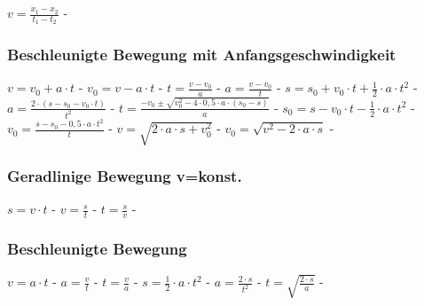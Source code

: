 $ v = \frac{x_{1}  - x_{2} }{t_{1}  - t_{2} } $ - \\ 
 
\subsubsection{Beschleunigte Bewegung mit Anfangsgeschwindigkeit} 
\begin{minipage}{0.45\textwidth} 
\end{minipage} 
\begin{minipage}{0.45\textwidth} 
 
\legende{}\end{minipage} 
 
$ v = v_{0}  + a\cdot t $ - $ v_{0}  = v - a\cdot t $ - $ t = \frac{v - v_{0} }{a} $ - $ a = \frac{v - v_{0} }{  t} $ - $ s = s_{0}  + v_{0} \cdot t + \frac{1}{2}\cdot a\cdot t^{2} $ - $ a = \frac{2\cdot (s - s_{0}  - v_{0} \cdot t)}{     t^{2} } $ - $ t = \frac{-v_{0}  \pm \sqrt{v_{0} ^{2} -4\cdot 0,5\cdot a\cdot (s_{0}  -s)}}{       a} $ - $ s_{0}  = s - v_{0} \cdot t - \frac{1}{2}\cdot a\cdot t^{2} $ - $ v_{0}  =\frac{s-s_{0} -0,5\cdot a\cdot t^{2} }{    t} $ - $ v  =\sqrt{2\cdot a \cdot s+ v_{0}^2} $ - $ v_{0}  =\sqrt{v^2-2\cdot a \cdot s} $ - \\ 
 
\subsubsection{Geradlinige Bewegung v=konst.} 
\begin{minipage}{0.45\textwidth} 
\end{minipage} 
\begin{minipage}{0.45\textwidth} 
 
\legende{}\end{minipage} 
 
$ s = v\cdot t $ - $ v = \frac{s}{t} $ - $ t = \frac{s}{v} $ - \\ 
 
\subsubsection{Beschleunigte Bewegung} 
\begin{minipage}{0.45\textwidth} 
\end{minipage} 
\begin{minipage}{0.45\textwidth} 
 
\legende{}\end{minipage} 
 
$ v = a\cdot t $ - $ a = \frac{v}{t} $ - $ t = \frac{v}{a} $ - $ s = \frac{1}{2}\cdot a\cdot t^{2} $ - $ a = \frac{2\cdot s}{t^{2} } $ - $ t = \sqrt{\frac{2\cdot s}{a}} $ - \\ 
 
